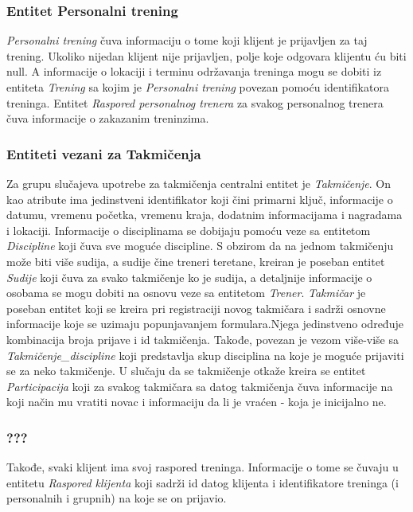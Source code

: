 \documentclass[../main.tex]{subfiles}
\begin{document}
\subsubsection{Entitet Personalni trening}

\textit{Personalni trening} čuva informaciju o tome koji klijent je prijavljen za taj trening. Ukoliko nijedan klijent nije prijavljen, polje koje odgovara klijentu ću biti null. A informacije o lokaciji i terminu održavanja treninga mogu se dobiti iz entiteta \textit{Trening} sa kojim je \textit{Personalni trening} povezan pomoću identifikatora treninga. Entitet \textit{Raspored personalnog trenera} za svakog personalnog trenera čuva informacije o zakazanim treninzima.


\subsubsection{Entiteti vezani za Takmičenja}

Za grupu slučajeva upotrebe za takmičenja centralni entitet je \textit{Takmičenje}. On kao atribute ima jedinstveni identifikator koji čini primarni ključ, informacije o datumu, vremenu početka, vremenu kraja, dodatnim informacijama i nagradama i lokaciji. Informacije o disciplinama se dobijaju pomoću veze sa entitetom \textit{Discipline} koji čuva sve moguće discipline. S obzirom da na jednom takmičenju može biti više sudija, a sudije čine treneri teretane, kreiran je poseban entitet \textit{Sudije} koji čuva za svako takmičenje ko je sudija, a detaljnije informacije o osobama se mogu dobiti na osnovu veze sa entitetom \textit{Trener}. \textit{Takmičar} je poseban entitet koji se kreira pri registraciji novog takmičara i sadrži osnovne informacije koje se uzimaju popunjavanjem formulara.Njega jedinstveno određuje kombinacija broja prijave i id takmičenja. Takođe, povezan je vezom više-više sa \textit{Takmičenje\_discipline} koji predstavlja skup disciplina na koje je moguće prijaviti se za neko takmičenje. U slučaju da se takmičenje otkaže kreira se entitet \textit{Participacija} koji za svakog takmičara sa datog takmičenja čuva informacije na koji način mu vratiti novac i informaciju da li je vraćen - koja je inicijalno ne. 
\subsubsection{???}
Takođe, svaki klijent ima svoj raspored treninga. Informacije o tome se čuvaju u entitetu \textit{Raspored klijenta} koji sadrži id datog klijenta i identifikatore treninga (i personalnih i grupnih) na koje se on prijavio.
\end{document}
